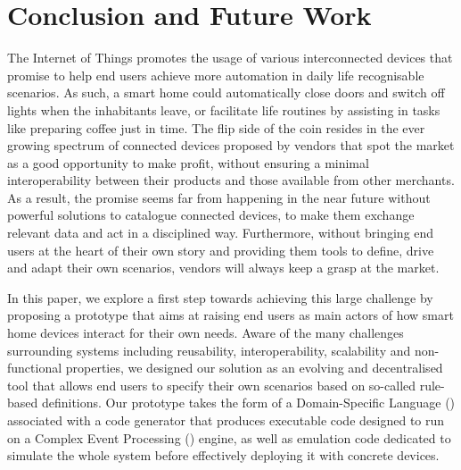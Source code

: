 \section{Conclusion and Future Work}
\label{sec:Conclusion}

The Internet of Things promotes the usage of various interconnected devices that pro\-mise to help end users achieve more automation in daily life recognisable scenarios. As such, a smart home could automatically close doors and switch off lights when the inhabitants leave, or facilitate life routines by assisting in tasks like preparing coffee just in time. The flip side of the coin resides in the ever growing spectrum of connected devices proposed by vendors that spot the market as a good opportunity to make profit, without ensuring a minimal interoperability between their products and those available from other merchants. As a result, the promise seems far from happening in the near future without powerful solutions to catalogue connected devices, to make them exchange relevant data and act in a disciplined way. Furthermore, without bringing end users at the heart of their own story and providing them tools to define, drive and adapt their own scenarios, vendors will always keep a grasp at the \IOT market.

In this paper, we explore a first step towards achieving this large challenge by proposing a prototype that aims at raising end users as main actors of how smart home devices interact for their own needs. Aware of the many challenges surrounding \IOT systems including reusability, interoperability, scalability and non-functional properties, we designed our solution as an evolving and decentralised tool that allows end users to specify their own scenarios based on so-called rule-based definitions. Our prototype takes the form of a Domain-Specific Language (\DSL) associated with a code generator that produces executable code designed to run on a Complex Event Processing (\CEP) engine, as well as emulation code dedicated to simulate the whole system before effectively deploying it with concrete devices.

